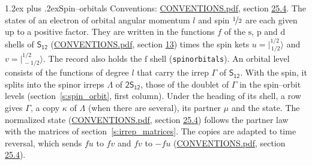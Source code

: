 \documentclass[10pt,a4paper]{article}
\makeatletter
\renewcommand\section{\@startsection{section}{1}{\z@}{-3ex plus -1ex minus -.2ex}%
  {1.2ex plus .2ex}{\normalfont\large\sffamily\bfseries\color{parttitle}}}
\numberwithin{equation}{section}
\newcommand{\grp}[1]{\mathsf{#1}}
\newcommand{\orbital}[1]{\mathrm{#1}}
\newcommand{\mult}{\kappa}
\newcommand{\intx}{\mu}
\newcommand{\jm}[2]{\bigl\lvert{}^{#1}_{\,#2}\bigr\rangle}
\makeatother
\begin{document}
\section{Spin--orbitals}\label{s:spin_orbitals}
Conventions: \href{../../CONVENTIONS.pdf}{CONVENTIONS.pdf}, section \href{../../CONVENTIONS.pdf\#conv.25.4}{25.4}.
\leavevmode\label{n:index.orbital.l}The states of an electron of orbital angular momentum $l$ and spin $\nicefrac{1}{2}$ are each given up to a positive factor. \label{n:local.spinor.uv}\label{n:local.function.f}They are written in the functions $f$ of the $\orbital{s}$, $\orbital{p}$ and $\orbital{d}$ shells of \href{../../../rotation/data/pdf/S12.pdf}{$\grp{S_{12}}$} (\href{../../CONVENTIONS.pdf}{CONVENTIONS.pdf}, section \href{../../../rotation/CONVENTIONS.pdf\#conv.13}{13}) times the spin kets $u = \jm{1/2}{1/2}$ and $v = \jm{1/2}{-1/2}$. The record also holds the $\orbital{f}$ shell (\texttt{spinorbitals}). An orbital level consists of the functions of degree $l$ that carry the irrep $\Gamma$ of \href{../../../rotation/data/pdf/S12.pdf}{$\grp{S_{12}}$}. With the spin, it splits into the spinor irreps $\Lambda$ of $\grp{2S_{12}}$, those of the doublet of $\Gamma$ in the spin--orbit levels (section~\ref{s:spin_orbit}, first column). \label{n:head.state}Under the heading of its shell, a row gives $\Gamma$, a copy $\mult$ of $\Lambda$ (when there are several), its partner $\intx$ and the state. The normalized state (\href{../../CONVENTIONS.pdf}{CONVENTIONS.pdf}, section \href{../../CONVENTIONS.pdf\#conv.25.4}{25.4}) follows the partner law with the matrices of section~\ref{s:irrep_matrices}. The copies are adapted to time reversal, which sends $f u$ to $f v$ and $f v$ to $-f u$ (\href{../../CONVENTIONS.pdf}{CONVENTIONS.pdf}, section \href{../../CONVENTIONS.pdf\#conv.25.4}{25.4}).
\end{document}
